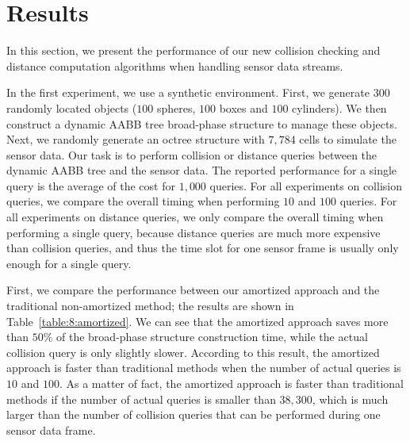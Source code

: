 \section{Results}
\label{sec:8:result}

In this section, we present the performance of our new collision checking
and distance computation algorithms when handling sensor data streams.

In the first experiment, we use a synthetic \mbox{environment}. First, we
generate $300$ randomly located objects ($100$ spheres, $100$ boxes
and $100$ cylinders). We then construct a dynamic AABB tree broad-phase structure to manage these objects. Next, we randomly generate
an octree structure with $7,784$ cells to simulate the sensor
data. Our task is to perform collision or distance queries between the
dynamic AABB tree and the sensor data. The reported performance for a
single query is the average of the cost for $1,000$ queries. For all experiments on collision queries, we compare the overall timing when performing $10$ and $100$ queries. For all experiments on distance queries, we only compare the overall timing when performing a single query, because distance queries are much more expensive than collision queries, and thus the time slot for one sensor frame is usually only enough for a single query.

First, we compare the performance between our amortized approach and the
traditional non-amortized method; the results are shown in
Table~\ref{table:8:amortized}. We can see that the amortized approach
saves more than $50\%$ of the broad-phase structure construction time,
while the actual collision query is only slightly slower. According to
this result, the amortized approach is faster than traditional methods
when the number of actual queries is $10$ and $100$. As a matter of fact,
the amortized approach is faster than traditional methods
if the number of actual queries is smaller than $38,300$, which is much
larger than the number of collision queries that can be performed during
one sensor data frame.



